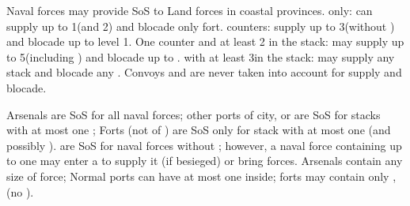 Naval forces may provide SoS to Land forces in coastal provinces.
\bparag \de only: can supply up to 1\LD (and 2\LDE) and blocade only fort.
\bparag \ND counters: supply up to 3\LD (without \ARMY) and blocade up to
\fortress level 1.
\bparag One \FLEET counter and at least 2 \ND in the stack: may supply up to
5\LD (including \ARMY) and blocade up to .
%
\bparag \FLEET\faceplus with at least 3\ND in the stack: may supply any stack
and blocade any \fortress.
\bparag Convoys and are never taken into account for supply and blocade.

Arsenals are SoS for all naval forces; other ports of city, \COL or \TP are SoS for
stacks with at most one \FLEET;
\bparag Forts (not of \TP) are SoS only for stack with at most one \ND
(and possibly \NDE).
\bparag \Presidios are SoS for naval forces without \FLEET;
however, a naval force containing up to one \FLEET may enter a
\Presidio to supply it (if besieged) or bring forces.
\bparag[Stacking:] Arsenals contain any size of force;
Normal ports can have at most one \FLEET inside;
forts may contain only \ND, \NDE (no \FLEET).


